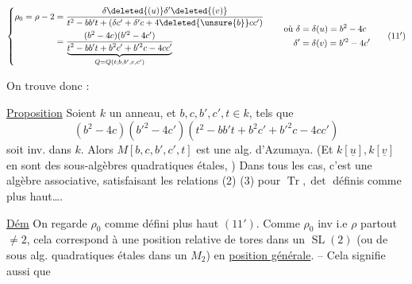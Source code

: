 \[
\left\{\begin{aligned}
\rho_0=\rho-2
&=\frac{\delta\deleted{(u)}\delta'\deleted{(v)}}{t^2-bb't+(\delta c'+\delta'c+4\deleted{\unsure{b}}cc')}\\
&=\frac{(b^2-4c)(b'^2-4c')}{\underbrace{t^2-bb't+b^2c'+b'^2c-4cc'}_{Q=Q(t;b,b',c,c')}}
\end{aligned}\right.\qquad
\begin{aligned}\text{où }\delta&=\delta(u)=b^2-4c\\ \delta'&=\delta(v)=b'^2-4c'\end{aligned}
\tag*{$(11')$}
\]

On trouve donc :

\uline{Proposition} Soient $k$ un anneau, et $b,c,b',c',t\in k$, tels que
\[ (b^2-4c)(b'^2-4c')(t^2-bb't+b^2c'+b'^2c-4cc') \]
soit inv. dans $k$. Alors $M[b,c,b',c',t]$ est une alg. d'Azumaya. (Et $k[\underline u],k[\underline v]$ en sont des sous-algèbres quadratiques étales, ) Dans tous les cas, c'est une algèbre associative,  satisfaisant les relations (2) (3) pour $\operatorname{Tr},\det$ définis comme plus haut\ldots.

\uline{Dém} On regarde $\rho_0$ comme défini plus haut $(11')$. Comme $\rho_0$  inv i.e $\rho$ partout $\ne2$, cela correspond à une position relative de tores dans un $\operatorname{SL}(2)$ (ou de sous alg. quadratiques  étales dans un $M_2$) en \uline{position générale}. -- Cela signifie aussi que
